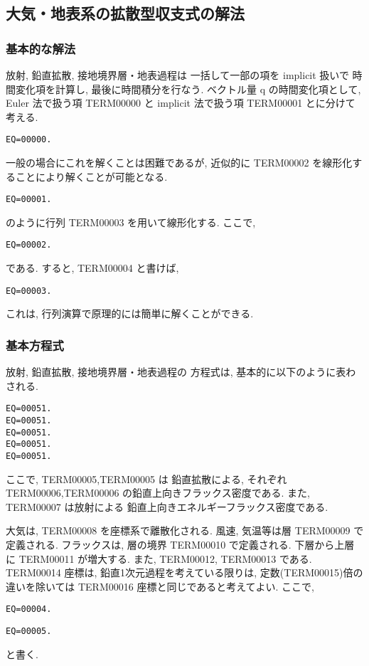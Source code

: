 ﻿
\subsection{大気・地表系の拡散型収支式の解法}

\subsubsection{基本的な解法}

放射, 鉛直拡散, 接地境界層・地表過程は
一括して一部の項を implicit 扱いで
時間変化項を計算し, 最後に時間積分を行なう.
ベクトル量 {\boldmath q} の時間変化項として,
Euler 法で扱う項 TERM00000 と implicit 法で扱う項 TERM00001 とに分けて考える.
%
\begin{verbatim}
EQ=00000.
\end{verbatim}
%
一般の場合にこれを解くことは困難であるが,
近似的に TERM00002 を線形化することにより解くことが可能となる.
\begin{verbatim}
EQ=00001.
\end{verbatim}
のように行列 TERM00003 を用いて線形化する.
ここで,
\begin{verbatim}
EQ=00002.
\end{verbatim}
である. 
すると, 
TERM00004
と書けば,
\begin{verbatim}
EQ=00003.
\end{verbatim}
%
これは, 行列演算で原理的には簡単に解くことができる.

\subsubsection{基本方程式}

放射, 鉛直拡散, 接地境界層・地表過程の
方程式は, 基本的に以下のように表わされる.
%
\begin{verbatim}
EQ=00051.
EQ=00051.
EQ=00051.
EQ=00051.
EQ=00051.
\end{verbatim}
%
ここで, TERM00005,TERM00005 は
鉛直拡散による, それぞれ TERM00006,TERM00006
の鉛直上向きフラックス密度である.
また, TERM00007 は放射による
鉛直上向きエネルギーフラックス密度である.

大気は, TERM00008 を座標系で離散化される.
風速, 気温等は層 TERM00009 で定義される.
フラックスは, 層の境界 TERM00010 で定義される.
下層から上層に TERM00011 が増大する.
また, TERM00012, 
TERM00013 である.
TERM00014 座標は, 鉛直1次元過程を考えている限りは, 
定数(TERM00015)倍の違いを除いては TERM00016 座標と同じであると考えてよい.
ここで,
\begin{verbatim}
EQ=00004.
\end{verbatim}
\begin{verbatim}
EQ=00005.
\end{verbatim}
と書く.

